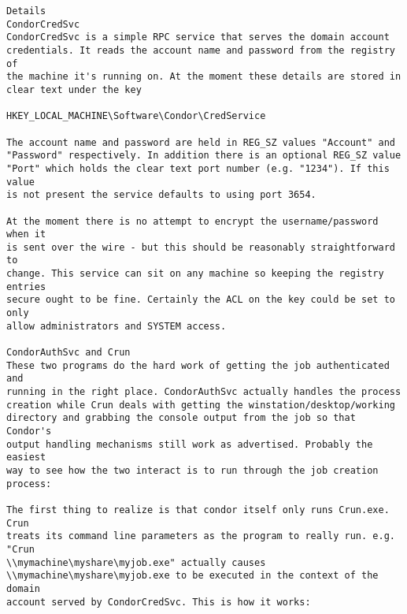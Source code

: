 \begin{description}
\begin{verbatim}
Details
CondorCredSvc
CondorCredSvc is a simple RPC service that serves the domain account 
credentials. It reads the account name and password from the registry of 
the machine it's running on. At the moment these details are stored in 
clear text under the key

HKEY_LOCAL_MACHINE\Software\Condor\CredService

The account name and password are held in REG_SZ values "Account" and 
"Password" respectively. In addition there is an optional REG_SZ value 
"Port" which holds the clear text port number (e.g. "1234"). If this value 
is not present the service defaults to using port 3654.

At the moment there is no attempt to encrypt the username/password when it 
is sent over the wire - but this should be reasonably straightforward to 
change. This service can sit on any machine so keeping the registry entries 
secure ought to be fine. Certainly the ACL on the key could be set to only 
allow administrators and SYSTEM access.

CondorAuthSvc and Crun
These two programs do the hard work of getting the job authenticated and 
running in the right place. CondorAuthSvc actually handles the process 
creation while Crun deals with getting the winstation/desktop/working 
directory and grabbing the console output from the job so that Condor's 
output handling mechanisms still work as advertised. Probably the easiest 
way to see how the two interact is to run through the job creation process:

The first thing to realize is that condor itself only runs Crun.exe. Crun 
treats its command line parameters as the program to really run. e.g. "Crun 
\\mymachine\myshare\myjob.exe" actually causes 
\\mymachine\myshare\myjob.exe to be executed in the context of the domain 
account served by CondorCredSvc. This is how it works:


\end{verbatim}
\end{description}
